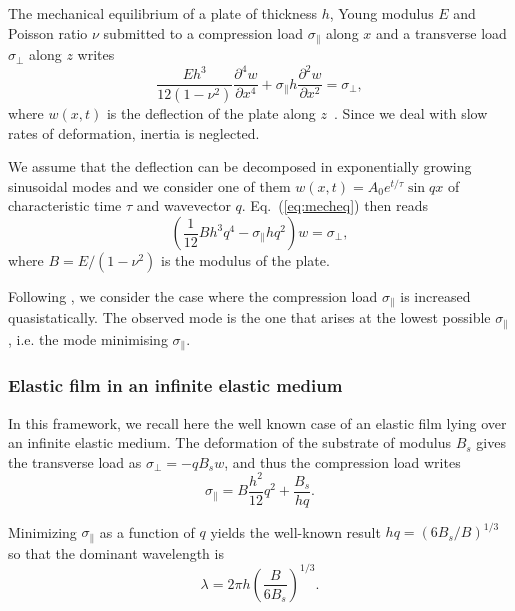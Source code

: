 \documentclass[twocolumn,superscriptaddress,showpacs,preprintnumbers,
amsmath,amssymb,prl]{revtex4-1}
\begin{document}
The mechanical equilibrium of a plate of thickness $h$, Young modulus $E$ and Poisson ratio $\nu$ submitted to a compression load $\sigma_\parallel$ along $x$ and a transverse load $\sigma_\perp$ along $z$ writes
\begin{equation}
\frac{E h^3}{12(1-\nu^2)}\frac{\partial^4 w}{\partial x^4} + \sigma_\parallel h \frac{\partial^2 w}{\partial x^2} = \sigma_\perp,
\label{eq:mecheq}
\end{equation}
where $w(x,t)$ is the deflection of the plate along $z$~\cite{Biot1957}. Since we deal with slow rates of deformation, inertia is neglected.

We assume that the deflection can be decomposed in exponentially growing sinusoidal modes and we consider one of them $w(x,t) =  A_0 e^{t/\tau} \sin qx$ of characteristic time $\tau$ and wavevector $q$. Eq.~(\ref{eq:mecheq}) then reads
\begin{equation}
\left(\frac{1}{12} B h^3 q^4 - \sigma_\parallel h q^2\right)w = \sigma_\perp,
\label{eq:mecheqop}
\end{equation}
where $B=E/(1-\nu^2)$ is the modulus of the plate.

Following \cite{Biot1957}, we consider the case where the compression load $\sigma_\parallel$ is increased quasistatically. The observed mode is the one that arises at the lowest possible $\sigma_\parallel$, i.e. the mode minimising $\sigma_\parallel$.

\subsubsection*{Elastic film in an infinite elastic medium}

In this framework, we recall here the well known case of an elastic film lying over an infinite elastic medium. The deformation of the substrate of modulus $B_s$ gives the transverse load as $\sigma_\perp = -q B_s w$, and thus the compression load writes
\begin{equation}
\sigma_\parallel = B \frac{h^2}{12} q^2 + \frac{B_s}{hq}.
\label{eq:sigma0}
\end{equation}

Minimizing $\sigma_\parallel$ as a function of $q$ yields the well-known result $hq = \left(6B_s/B\right)^{1/3}$ \cite{Biot1957,Cerda2003} so that the dominant wavelength is 
\begin{equation}
\lambda = 2\pi h \left(\frac{B}{6B_s}\right)^{1/3}.
\label{eq:lambdaElEl}
\end{equation}
\end{document}
